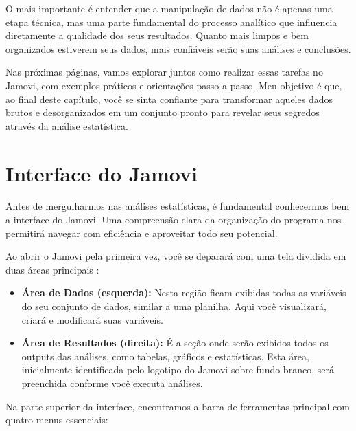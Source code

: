 O mais importante é entender que a manipulação de dados não é apenas uma etapa técnica, mas uma parte fundamental do processo analítico que influencia diretamente a qualidade dos seus resultados. Quanto mais limpos e bem organizados estiverem seus dados, mais confiáveis serão suas análises e conclusões.

Nas próximas páginas, vamos explorar juntos como realizar essas tarefas no Jamovi, com exemplos práticos e orientações passo a passo. Meu objetivo é que, ao final deste capítulo, você se sinta confiante para transformar aqueles dados brutos e desorganizados em um conjunto pronto para revelar seus segredos através da análise estatística.

\section{Interface do Jamovi}

Antes de mergulharmos nas análises estatísticas, é fundamental conhecermos bem a interface do Jamovi. Uma compreensão clara da organização do programa nos permitirá navegar com eficiência e aproveitar todo seu potencial.

Ao abrir o Jamovi pela primeira vez, você se deparará com uma tela dividida em duas áreas principais :

\begin{itemize}
    \item \textbf{Área de Dados (esquerda):} Nesta região ficam exibidas todas as variáveis do seu conjunto de dados, similar a uma planilha. Aqui você visualizará, criará e modificará suas variáveis.

    \item \textbf{Área de Resultados (direita):} É a seção onde serão exibidos todos os outputs das análises, como tabelas, gráficos e estatísticas. Esta área, inicialmente identificada pelo logotipo do Jamovi sobre fundo branco, será preenchida conforme você executa análises.
\end{itemize}

Na parte superior da interface, encontramos a barra de ferramentas principal com quatro menus essenciais:

